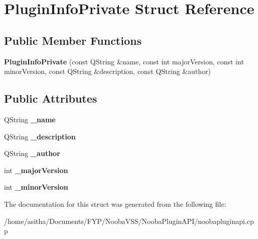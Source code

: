 \hypertarget{struct_plugin_info_private}{\section{Plugin\-Info\-Private Struct Reference}
\label{struct_plugin_info_private}
}
\subsection*{Public Member Functions}
\begin{DoxyCompactItemize}
\item 
\hypertarget{struct_plugin_info_private_aa456adcfaa1bc3032c79a6bff88e21af}{{\bfseries Plugin\-Info\-Private} (const Q\-String \&name, const int major\-Version, const int minor\-Version, const Q\-String \&description, const Q\-String \&author)}\label{struct_plugin_info_private_aa456adcfaa1bc3032c79a6bff88e21af}

\end{DoxyCompactItemize}
\subsection*{Public Attributes}
\begin{DoxyCompactItemize}
\item 
\hypertarget{struct_plugin_info_private_a9aef39162eb012be3d0346c5bd4bee60}{Q\-String {\bfseries \-\_\-name}}\label{struct_plugin_info_private_a9aef39162eb012be3d0346c5bd4bee60}

\item 
\hypertarget{struct_plugin_info_private_a211871dfad64901e4d4a6e185eba46da}{Q\-String {\bfseries \-\_\-description}}\label{struct_plugin_info_private_a211871dfad64901e4d4a6e185eba46da}

\item 
\hypertarget{struct_plugin_info_private_a4811906914ca75ce88a83d5cfd6f0801}{Q\-String {\bfseries \-\_\-author}}\label{struct_plugin_info_private_a4811906914ca75ce88a83d5cfd6f0801}

\item 
\hypertarget{struct_plugin_info_private_ae9146c8770236fb182be9a902a332ae3}{int {\bfseries \-\_\-major\-Version}}\label{struct_plugin_info_private_ae9146c8770236fb182be9a902a332ae3}

\item 
\hypertarget{struct_plugin_info_private_a60f83bdde05cd0f91ba24d4f2f2ec308}{int {\bfseries \-\_\-minor\-Version}}\label{struct_plugin_info_private_a60f83bdde05cd0f91ba24d4f2f2ec308}

\end{DoxyCompactItemize}


The documentation for this struct was generated from the following file\-:\begin{DoxyCompactItemize}
\item 
/home/asitha/\-Documents/\-F\-Y\-P/\-Nooba\-V\-S\-S/\-Nooba\-Plugin\-A\-P\-I/noobapluginapi.\-cpp\end{DoxyCompactItemize}
